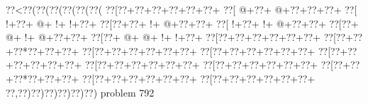 \vbox{\vbox{\goo
\0??<\0??(\0??(\0??(\0??(\0??(\0??(
\0??[\0??+\0??+\0??+\0??+\0??+\0??+
\0??[\- @+\0??+\- @+\0??+\0??+\0??+
\0??[\- !+\0??+\- @+\- !+\- !+\0??+
\0??[\0??+\0??+\- !+\- @+\0??+\0??+
\0??[\- !+\0??+\- !+\- @+\0??+\0??+
\0??[\0??+\- @+\- !+\- @+\0??+\0??+
\0??[\0??+\- @+\- @+\- !+\- !+\0??+
\0??[\0??+\0??+\0??+\0??+\0??+\0??+
\0??[\0??+\0??+\0??*\0??+\0??+\0??+
\0??[\0??+\0??+\0??+\0??+\0??+\0??+
\0??[\0??+\0??+\0??+\0??+\0??+\0??+
\0??[\0??+\0??+\0??+\0??+\0??+\0??+
\0??[\0??+\0??+\0??+\0??+\0??+\0??+
\0??[\0??+\0??+\0??+\0??+\0??+\0??+
\0??[\0??+\0??+\0??*\0??+\0??+\0??+
\0??[\0??+\0??+\0??+\0??+\0??+\0??+
\0??[\0??+\0??+\0??+\0??+\0??+\0??+
\0??,\0??)\0??)\0??)\0??)\0??)\0??)
}
\hfil problem 792\hfil\break
}
